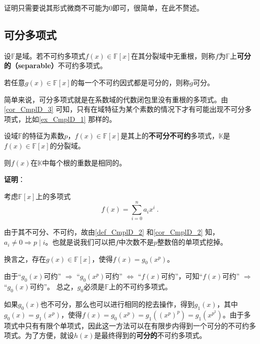证明只需要说其形式微商不可能为$0$即可，很简单，在此不赘述。




\subsection{可分多项式}


\begin{definition}{}\label{def_CmplD_2}

设$\mathbb{F}$是域。若不可约多项式$f(x)\in\mathbb{F}[x]$在其分裂域中无重根，则称$f$为$\mathbb{F}$上\textbf{可分的（separable）}不可约多项式。

若任意$g(x)\in\mathbb{F}[x]$的每一个不可约因式都是可分的，则称$g$可分。

\end{definition}

简单来说，可分多项式就是在系数域的代数闭包里没有重根的多项式。由\autoref{cor_CmplD_3} 可知，只有在域特征为某个素数的情况下才有可能出现不可分多项式，比如\autoref{ex_CmplD_1} 那样的。


\begin{theorem}{}\label{the_CmplD_3}
设域$\mathbb{F}$的特征为素数$p$，$f(x)\in\mathbb{F}[x]$是其上的\textbf{不可分不可约}多项式，$\mathbb{K}$是$f(x)\in\mathbb{F}[x]$的分裂域。

则$f(x)$在$\mathbb{K}$中每个根的重数是相同的。
\end{theorem}

\textbf{证明}：

考虑$\mathbb{F}[x]$上的多项式
\begin{equation}
f(x) = \sum_{i=0}^n a_ix^i~.
\end{equation}


由于其不可分、不可约，故由\autoref{def_CmplD_2} 和\autoref{cor_CmplD_2} 知，$a_i\neq 0 \Rightarrow p\mid i$。也就是说我们可以把$f$中次数不是$p$整数倍的单项式挖掉。

换言之，存在$g(x)\in\mathbb{F}[x]$，使得$f(x)=g_0(x^p)$。

由于“$g_0(x)$可约” $\Rightarrow$ “$g_0(x^p)$可约” $\iff$ “$f(x)$可约”，可知“$f(x)$可约” $\Rightarrow$ “$g_0(x)$可约”。 总之，$g_0$必须是$\mathbb{F}$上的不可约多项式。

如果$g_0(x)$也不可分，那么也可以进行相同的挖去操作，得到$g_1(x)$，其中$g_0(x) = g_1(x^p)$，使得$f(x) = g_0(x^p) = g_1((x^p)^p) = g_1(x^{p^2})$。由于多项式中只有有限个单项式，因此这一方法可以在有限步内得到一个可分的不可约多项式。为了方便，就设$h(x)$是最终得到的\textbf{可分的}不可约多项式。

